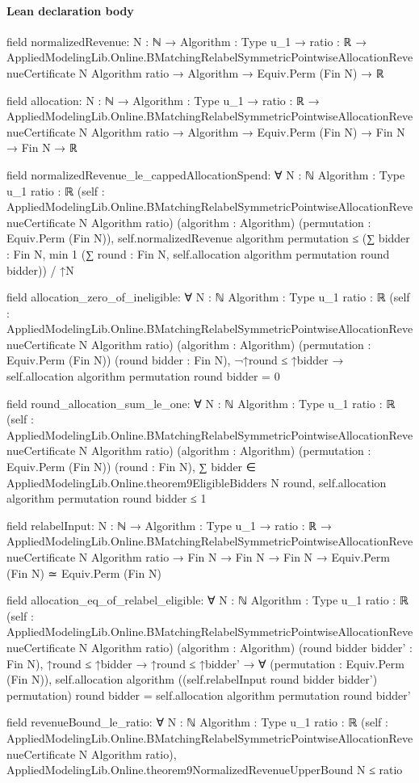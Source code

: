 \documentclass[10pt]{article}
\begin{document}
\paragraph{Lean declaration body}
\begin{ReviewVerbatim}
field normalizedRevenue:
{N : ℕ} →
  {Algorithm : Type u_1} →
    {ratio : ℝ} →
      AppliedModelingLib.Online.BMatchingRelabelSymmetricPointwiseAllocationRevenueCertificate N Algorithm ratio →
        Algorithm → Equiv.Perm (Fin N) → ℝ

field allocation:
{N : ℕ} →
  {Algorithm : Type u_1} →
    {ratio : ℝ} →
      AppliedModelingLib.Online.BMatchingRelabelSymmetricPointwiseAllocationRevenueCertificate N Algorithm ratio →
        Algorithm → Equiv.Perm (Fin N) → Fin N → Fin N → ℝ

field normalizedRevenue_le_cappedAllocationSpend:
∀ {N : ℕ} {Algorithm : Type u_1} {ratio : ℝ}
  (self : AppliedModelingLib.Online.BMatchingRelabelSymmetricPointwiseAllocationRevenueCertificate N Algorithm ratio)
  (algorithm : Algorithm) (permutation : Equiv.Perm (Fin N)),
  self.normalizedRevenue algorithm permutation ≤
    (∑ bidder : Fin N, min 1 (∑ round : Fin N, self.allocation algorithm permutation round bidder)) / ↑N

field allocation_zero_of_ineligible:
∀ {N : ℕ} {Algorithm : Type u_1} {ratio : ℝ}
  (self : AppliedModelingLib.Online.BMatchingRelabelSymmetricPointwiseAllocationRevenueCertificate N Algorithm ratio)
  (algorithm : Algorithm) (permutation : Equiv.Perm (Fin N)) (round bidder : Fin N),
  ¬↑round ≤ ↑bidder → self.allocation algorithm permutation round bidder = 0

field round_allocation_sum_le_one:
∀ {N : ℕ} {Algorithm : Type u_1} {ratio : ℝ}
  (self : AppliedModelingLib.Online.BMatchingRelabelSymmetricPointwiseAllocationRevenueCertificate N Algorithm ratio)
  (algorithm : Algorithm) (permutation : Equiv.Perm (Fin N)) (round : Fin N),
  ∑ bidder ∈ AppliedModelingLib.Online.theorem9EligibleBidders N round,
      self.allocation algorithm permutation round bidder ≤
    1

field relabelInput:
{N : ℕ} →
  {Algorithm : Type u_1} →
    {ratio : ℝ} →
      AppliedModelingLib.Online.BMatchingRelabelSymmetricPointwiseAllocationRevenueCertificate N Algorithm ratio →
        Fin N → Fin N → Fin N → Equiv.Perm (Fin N) ≃ Equiv.Perm (Fin N)

field allocation_eq_of_relabel_eligible:
∀ {N : ℕ} {Algorithm : Type u_1} {ratio : ℝ}
  (self : AppliedModelingLib.Online.BMatchingRelabelSymmetricPointwiseAllocationRevenueCertificate N Algorithm ratio)
  (algorithm : Algorithm) (round bidder bidder' : Fin N),
  ↑round ≤ ↑bidder →
    ↑round ≤ ↑bidder' →
      ∀ (permutation : Equiv.Perm (Fin N)),
        self.allocation algorithm ((self.relabelInput round bidder bidder') permutation) round bidder =
          self.allocation algorithm permutation round bidder'

field revenueBound_le_ratio:
∀ {N : ℕ} {Algorithm : Type u_1} {ratio : ℝ}
  (self : AppliedModelingLib.Online.BMatchingRelabelSymmetricPointwiseAllocationRevenueCertificate N Algorithm ratio),
  AppliedModelingLib.Online.theorem9NormalizedRevenueUpperBound N ≤ ratio
\end{ReviewVerbatim}
\end{document}
